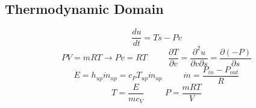 \documentclass[ 12pt, twocolumn]{article}    %
\begin{document}
\subsection*{Thermodynamic Domain}
\begin{equation*}
    \frac{du}{dt}  = T\Dot{s}-P\dot{v}
\end{equation*}
\begin{equation*}
    PV =mRT \rightarrow Pv = RT \hspace{30pt}  \frac{\partial{T}}{\partial{v}} = \frac{\partial^2u}{\partial v \partial s} =  \frac{\partial{
    (-P)}}{\partial{s}}
\end{equation*}
\begin{equation*}
    \dot{E} =h_{up}\dot{m}_{up} = c_PT_{up}\dot{m}_{up} \hspace{30pt} \dot{m} =\frac{P_{in}-P_{out}}{R}
\end{equation*}
\begin{equation*}
    T =\frac{E}{mc_V}\hspace{30pt} P = \frac{mRT}{V}
\end{equation*}
\begin{center}
    \begin{footnotesize}
    \end{footnotesize}
\end{center}
\end{document}
